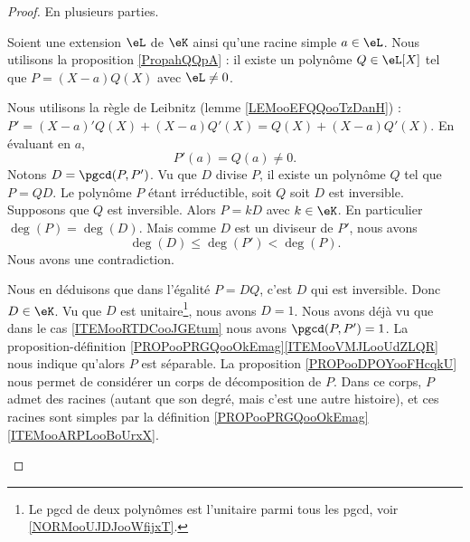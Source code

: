 \begin{proof}
    En plusieurs parties.
    \begin{subproof}
        Soient une extension \( \eL\) de \( \eK\) ainsi qu'une racine simple \( a\in \eL\). Nous utilisons la proposition \ref{PropahQQpA} : il existe un polynôme \( Q\in \eL[X]\) tel que \( P=(X-a)Q(X)\) avec \( \eL\neq 0\).

        Nous utilisons la règle de Leibnitz (lemme \ref{LEMooEFQQooTzDanH}) : \( P'=(X-a)'Q(X)+(X-a)Q'(X)=Q(X)+(X-a)Q'(X)\). En évaluant en \( a\),
        \begin{equation}
            P'(a)=Q(a)\neq 0.
        \end{equation}
        \spitem[\ref{ITEMooRTDCooJGEtum} implique \( \pgcd(P,P')=1\)]
        Notons \( D=\pgcd(P,P')\). Vu que \( D\) divise \( P\), il existe un polynôme \( Q\) tel que \( P=QD\). Le polynôme \( P\) étant irréductible, soit \( Q\) soit \( D\) est inversible. Supposons que \( Q\) est inversible. Alors \( P=kD\) avec \( k\in \eK\). En particulier \( \deg(P)=\deg(D)\). Mais comme \( D\) est un diviseur de \( P'\), nous avons
        \begin{equation}
            \deg(D)\leq \deg(P')<\deg(P).
        \end{equation}
        Nous avons une contradiction.

        Nous en déduisons que dans l'égalité \( P=DQ\), c'est \( D\) qui est inversible. Donc \( D\in \eK\). Vu que \( D\) est unitaire\footnote{Le pgcd de deux polynômes est l'unitaire parmi tous les pgcd, voir \ref{NORMooUJDJooWfijxT}.}, nous avons \( D=1\).
        Nous avons déjà vu que dans le cas \ref{ITEMooRTDCooJGEtum} nous avons \( \pgcd(P,P')=1\). La proposition-définition \ref{PROPooPRGQooOkEmag}\ref{ITEMooVMJLooUdZLQR} nous indique qu'alors \( P\) est séparable.
        La proposition \ref{PROPooDPOYooFHcqkU} nous permet de considérer un corps de décomposition de \( P\). Dans ce corps, \( P\) admet des racines (autant que son degré, mais c'est une autre histoire), et ces racines sont simples par la définition \ref{PROPooPRGQooOkEmag}\ref{ITEMooARPLooBoUrxX}.
    \end{subproof}
\end{proof}

